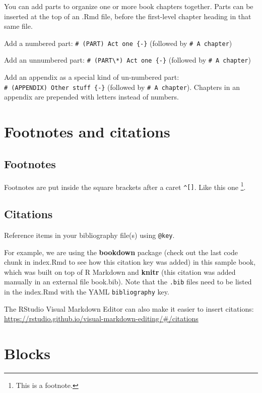 \documentclass[
]{book}
\theoremstyle{definition}
\theoremstyle{definition}
\theoremstyle{definition}
\theoremstyle{definition}
\theoremstyle{remark}
\begin{document}
You can add parts to organize one or more book chapters together. Parts can be inserted at the top of an .Rmd file, before the first-level chapter heading in that same file.

Add a numbered part: \texttt{\#\ (PART)\ Act\ one\ \{-\}} (followed by \texttt{\#\ A\ chapter})

Add an unnumbered part: \texttt{\#\ (PART\textbackslash{}*)\ Act\ one\ \{-\}} (followed by \texttt{\#\ A\ chapter})

Add an appendix as a special kind of un-numbered part: \texttt{\#\ (APPENDIX)\ Other\ stuff\ \{-\}} (followed by \texttt{\#\ A\ chapter}). Chapters in an appendix are prepended with letters instead of numbers.

\chapter{Footnotes and citations}\label{footnotes-and-citations}

\section{Footnotes}\label{footnotes}

Footnotes are put inside the square brackets after a caret \texttt{\^{}{[}{]}}. Like this one \footnote{This is a footnote.}.

\section{Citations}\label{citations}

Reference items in your bibliography file(s) using \texttt{@key}.

For example, we are using the \textbf{bookdown} package \citep{R-bookdown} (check out the last code chunk in index.Rmd to see how this citation key was added) in this sample book, which was built on top of R Markdown and \textbf{knitr} \citep{xie2015} (this citation was added manually in an external file book.bib).
Note that the \texttt{.bib} files need to be listed in the index.Rmd with the YAML \texttt{bibliography} key.

The RStudio Visual Markdown Editor can also make it easier to insert citations: \url{https://rstudio.github.io/visual-markdown-editing/\#/citations}

\chapter{Blocks}\label{blocks}
\end{document}
